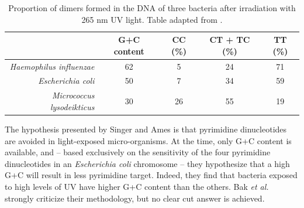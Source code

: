 \documentclass{article}
\begin{document}
\begin{table}[H]
\begin{center}
\begin{tabular}{rcccc}
  \hline
  & G+C content & CC (\%) & CT + TC (\%) & TT (\%)\\
  \hline
  \textit{Haemophilus influenzae} & 62 & 5 & 24 & 71 \\
  \hline
  \textit{Escherichia coli} & 50 & 7 & 34 & 59 \\
  \hline
  \textit{Micrococcus lysodeikticus} & 30 & 26 & 55 & 19 \\
  \hline
\end{tabular}
\caption{Proportion of dimers formed in the DNA of three bacteria
  after irradiation with 265 nm UV light. Table adapted from
  \cite{Setlow}.}
\label{sensitivity}
\end{center}
\end{table}


The hypothesis presented by Singer and Ames \cite{Singer} is that
pyrimidine dinucleotides are avoided in light-exposed micro-organisms.
At the time, only G+C content is available, and -- based exclusively
on the sensitivity of the four pyrimidine dinucleotides in an
\textit{Escherichia coli} chromosome -- they hypothesize that a high
G+C will result in less pyrimidine target. Indeed, they find that
bacteria exposed to high levels of UV have higher G+C content than the
others. Bak \textit{et al.} \cite{Bak} strongly criticize their
methodology, but no clear cut answer is achieved.
\end{document}
